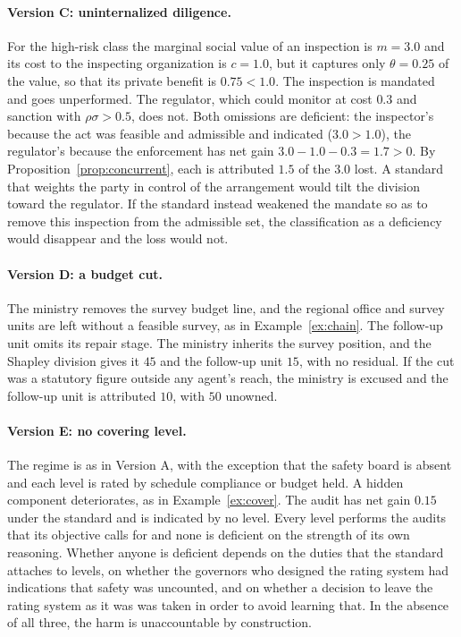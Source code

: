 \documentclass[11pt]{article}
\theoremstyle{plain}
\theoremstyle{definition}
\begin{document}
\paragraph{Version C: uninternalized diligence.} For the high-risk class the marginal social value of an inspection is $m=3.0$ and its cost to the inspecting organization is $c=1.0$, but it captures only $\theta=0.25$ of the value, so that its private benefit is $0.75<1.0$. The inspection is mandated and goes unperformed. The regulator, which could monitor at cost $0.3$ and sanction with $\rho\sigma>0.5$, does not. Both omissions are deficient: the inspector's because the act was feasible and admissible and indicated ($3.0>1.0$), the regulator's because the enforcement has net gain $3.0-1.0-0.3=1.7>0$. By Proposition~\ref{prop:concurrent}, each is attributed $1.5$ of the $3.0$ lost. A standard that weights the party in control of the arrangement would tilt the division toward the regulator. If the standard instead weakened the mandate so as to remove this inspection from the admissible set, the classification as a deficiency would disappear and the loss would not.

\paragraph{Version D: a budget cut.} The ministry removes the survey budget line, and the regional office and survey units are left without a feasible survey, as in Example~\ref{ex:chain}. The follow-up unit omits its repair stage. The ministry inherits the survey position, and the Shapley division gives it $45$ and the follow-up unit $15$, with no residual. If the cut was a statutory figure outside any agent's reach, the ministry is excused and the follow-up unit is attributed $10$, with $50$ unowned.

\paragraph{Version E: no covering level.} The regime is as in Version A, with the exception that the safety board is absent and each level is rated by schedule compliance or budget held. A hidden component deteriorates, as in Example~\ref{ex:cover}. The audit has net gain $0.15$ under the standard and is indicated by no level. Every level performs the audits that its objective calls for and none is deficient on the strength of its own reasoning. Whether anyone is deficient depends on the duties that the standard attaches to levels, on whether the governors who designed the rating system had indications that safety was uncounted, and on whether a decision to leave the rating system as it was was taken in order to avoid learning that. In the absence of all three, the harm is unaccountable by construction.
\end{document}
